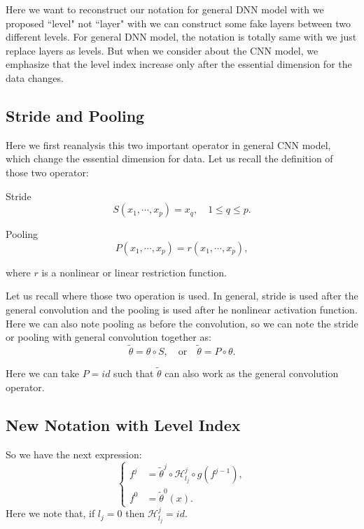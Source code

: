 Here we want to reconstruct our notation for general DNN model with we proposed ``level" not ``layer" with we can construct some fake layers between two different levels. For general DNN model, the notation is totally same with we just replace layers as levels. But when we consider about the CNN model, we emphasize that the level index increase only after the essential dimension for the data changes.

\subsection{Stride and Pooling}
Here we first reanalysis this two important operator in general CNN model, which change the essential dimension for data. Let us recall the definition of those two operator:
\begin{definition}{Stride}
	\begin{equation}
	S(x_1, \cdots, x_p) = x_q, \quad  1 \le q \le p.
	\end{equation}
\end{definition}

\begin{definition}{Pooling}
\begin{equation}
P(x_1, \cdots, x_p) = r(x_1, \cdots, x_p),
\end{equation}
\end{definition}
where $r$ is a nonlinear or linear restriction function.

Let us recall where those two operation is used. In general, stride is used after the general convolution and the pooling is used after he nonlinear activation function.  Here we can also note pooling as before the convolution, so we can note the stride or pooling with general convolution together as:
\begin{equation}\label{stride-pooling}
\tilde \theta = \theta \circ S, \quad \text{or} \quad \tilde \theta = P\circ \theta.
\end{equation}
\begin{remark}
	Here we can take $P = id$ such that $\tilde \theta$ can also work as the general convolution operator.
\end{remark}

\subsection{New Notation with Level Index}

So we have the next expression:
\begin{equation}\label{new-dnn}
\begin{cases}
	f^j &= \tilde \theta^j\circ \mathcal{H}^j_{l_j} \circ g(f^{j-1}), \\
	f^0 &= \tilde \theta^0(x).
\end{cases}
\end{equation}
Here we note that, if $l_j = 0$ then $\mathcal{H}^j_{l_j} = id$.

